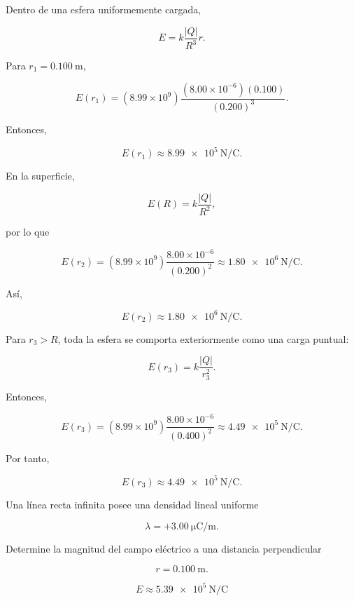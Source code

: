 \begin{explicacion}

Dentro de una esfera uniformemente cargada,

\[
E=k\frac{|Q|}{R^3}r.
\]

Para \(r_1=\SI{0.100}{\metre}\),

\[
E(r_1)
=(8.99\times10^9)
\frac{(8.00\times10^{-6})(0.100)}{(0.200)^3}.
\]

Entonces,

\[
\boxed{E(r_1)\approx\SI{8.99e5}{\newton\per\coulomb}}.
\]

En la superficie,

\[
E(R)=k\frac{|Q|}{R^2},
\]

por lo que

\[
E(r_2)
=(8.99\times10^9)
\frac{8.00\times10^{-6}}{(0.200)^2}
\approx\SI{1.80e6}{\newton\per\coulomb}.
\]

Así,

\[
\boxed{E(r_2)\approx\SI{1.80e6}{\newton\per\coulomb}}.
\]

Para \(r_3>R\), toda la esfera se comporta exteriormente como una carga puntual:

\[
E(r_3)=k\frac{|Q|}{r_3^2}.
\]

Entonces,

\[
E(r_3)
=(8.99\times10^9)
\frac{8.00\times10^{-6}}{(0.400)^2}
\approx\SI{4.49e5}{\newton\per\coulomb}.
\]

Por tanto,

\[
\boxed{E(r_3)\approx\SI{4.49e5}{\newton\per\coulomb}}.
\]

\end{explicacion}


\begin{ejercicio}

Una línea recta infinita posee una densidad lineal uniforme

\[
\lambda=+\SI{3.00}{\micro\coulomb\per\metre}.
\]

Determine la magnitud del campo eléctrico a una distancia perpendicular

\[
r=\SI{0.100}{\metre}.
\]

\end{ejercicio}

\begin{respuesta}

\[
\boxed{E\approx\SI{5.39e5}{\newton\per\coulomb}}
\]

\end{respuesta}

